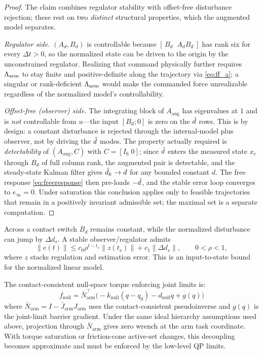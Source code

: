 \begin{proof}
The claim combines regulator stability with offset-free disturbance rejection;
these rest on two \emph{distinct} structural properties, which the augmented
model separates.

\emph{Regulator side.} $(A_d,B_d)$ is controllable because
$[\,B_d\;\;A_dB_d\,]$ has rank six for every $\Delta t>0$, so the normalized
state can be driven to the origin by the unconstrained regulator. Realizing
that command physically further requires $\Lambda_{\text{arm}}$ to stay finite and
positive-definite along the trajectory via \eqref{eq:ff_a}; a singular or
rank-deficient $\Lambda_{\text{arm}}$ would make the commanded force unrealizable regardless
of the normalized model's controllability.

\emph{Offset-free (observer) side.} The integrating block of
$A_{\text{aug}}$ has eigenvalues at $1$ and is \emph{not} controllable from
$u$---the input $[B_d;0]$ is zero on the $\hat{d}$ rows. This is by
design: a constant disturbance is rejected through the internal-model plus
observer, not by driving the $\hat{d}$ modes. The property actually required is
\emph{detectability} of $(A_{\text{aug}},C)$ with $C=[I_6\;0]$; since $\hat{d}$
enters the measured state $x_e$ through $B_d$ of full column rank, the
augmented pair is detectable, and the steady-state Kalman filter gives
$\hat{d}_{k}\to d$ for any bounded constant $d$. The free response
\eqref{eq:freeresponse} then pre-loads $-\hat{d}$, and the stable error loop
converges to $e_\infty=0$. Under saturation this conclusion applies only to
feasible trajectories that remain in a positively invariant admissible set;
the maximal set is a separate computation.
\end{proof}

Across a contact switch $B_d$ remains constant, while the normalized
disturbance can jump by $\Delta d_s$. A stable observer/regulator admits
\begin{equation}\label{eq:transient}
  \|e(t)\|\leq c_0\rho^{t-t_s}\|z(t_s)\|+c_1\|\Delta d_s\|,
  \qquad 0<\rho<1 ,
\end{equation}
where $z$ stacks regulation and estimation error. This is an input-to-state
bound for the normalized linear model.

The contact-consistent null-space torque enforcing joint limits is:
\begin{equation}\label{eq:null}
  f_{\text{null}}
    = \bar{N}_{\text{arm}}^\top\bigl(-k_{\text{null}}(q-q_0)
      -d_{\text{null}}\dot{q}+g(q)\bigr)
\end{equation}
where $\bar{N}_{\text{arm}}=I-\bar{J}_{\text{arm}}J_{\text{arm}}$ uses the
contact-consistent pseudoinverse and $g(q)$ is the joint-limit barrier
gradient.
Under the same ideal hierarchy assumptions used above, projection through
$\bar{N}_{\text{arm}}$ gives zero wrench at the arm task coordinate. With
torque saturation or friction-cone active-set changes, this decoupling becomes
approximate and must be enforced by the low-level QP limits.

